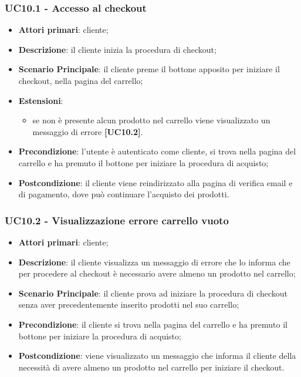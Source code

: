 \subsubsection{UC10.1 - Accesso al checkout}
\begin{itemize}
\item \textbf{Attori primari}: cliente;
\item \textbf{Descrizione}: il cliente inizia la procedura di checkout;
\item \textbf{Scenario Principale}: il cliente preme il bottone apposito per iniziare il checkout, nella pagina del carrello;
\item \textbf{Estensioni}:
\begin{itemize}
\item se non è presente alcun prodotto nel carrello viene visualizzato un messaggio di errore \textbf{[UC10.2]}.
\end{itemize}
\item \textbf{Precondizione}: l'utente è autenticato come cliente, si trova nella pagina del carrello e ha premuto il bottone per iniziare la procedura di acquisto;
\item \textbf{Postcondizione}: il cliente viene reindirizzato alla pagina di verifica email e di pagamento, dove può continuare l'acquisto dei prodotti.
\end{itemize}

\subsubsection{UC10.2 - Visualizzazione errore carrello vuoto}
\begin{itemize}
\item \textbf{Attori primari}: cliente;
\item \textbf{Descrizione}: il cliente visualizza un messaggio di errore che lo informa che per procedere al checkout è necessario avere almeno un prodotto nel carrello;
\item \textbf{Scenario Principale}: il cliente prova ad iniziare la procedura di checkout senza aver precedentemente inserito prodotti nel suo carrello;
\item \textbf{Precondizione}: il cliente si trova nella pagina del carrello e ha premuto il bottone  per iniziare la procedura di acquisto;
\item \textbf{Postcondizione}: viene visualizzato un messaggio che informa il cliente della necessità di avere almeno un prodotto nel carrello per iniziare il checkout.
\end{itemize}

